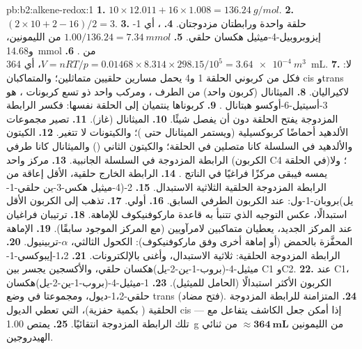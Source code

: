 \begin{solution}{pb:b2:alkene-redox:1}
\textbf{1.} $10 \times 12.011 + 16 \times 1.008 = \qty{136.24}{g/mol}$.
\textbf{2.} $(2 \times 10 + 2 - 16)/2 = 3$.
\textbf{3.} حلقة واحدة ورابطتان مزدوجتان.
\textbf{4.} ، أي 1-إيزوبروبيل-4-ميثيل هكسان حلقي.
\textbf{5.} $1.00/136.24 = \qty{7.34}{mmol}$ من الليمونين، و\qty{14.68}{mmol} من .
\textbf{6.} $V = nRT/p = 0.01468 \times 8.314 \times 298.15/10^5 = \qty{3.64e-4}{m^3}$،
أي \qty{364}{mL}.
\textbf{7.} لا: فكل من كربوني الحلقة 1 و4 يحمل مسارين حلقيين متماثلين؛ والمتماكبان cis 
وtrans لاكيراليان.
\textbf{8.} الميثانال  (كربون واحد) من الطرف ، ومركب واحد ذو تسع كربونات ،
هو 3-أسيتيل-6-أوكسو هبتانال .
\textbf{9.} كربوناها ينتميان إلى الحلقة نفسها: فكسر الرابطة المزدوجة يفتح الحلقة
دون أن يفصل شيئًا.
\textbf{10.} الميثانال (غاز).
\textbf{11.} تصير مجموعات الألدهيد أحماضًا كربوكسيلية (ويستمر الميثانال حتى )؛ 
والكيتونات لا تتغير.
\textbf{12.} الكيتون والألدهيد في السلسلة  كانا متصلين في الحلقة؛ والكيتون الثاني
() والميثانال كانا طرفي الرابطة المزدوجة في السلسلة الجانبية.
\textbf{13.} مركز واحد (الكربون C4 في الحلقة)؛ ولا يمسه  فيبقى
مركزًا فراغيًا في الناتج .
\textbf{14.} الرابطة  الخارج حلقية، الأقل إعاقة من الرابطة المزدوجة الحلقية الثلاثية الاستبدال.
\textbf{15.} 2-(4-ميثيل هكس-3-ين حلقي-1-يل)بروبان-1-ول:  عند الكربون الطرفي
السابق.
\textbf{16.} أولي.
\textbf{17.} تذهب  إلى الكربون الأقل استبدالًا، عكس التوجيه الذي
تتنبأ به قاعدة ماركوفنيكوف للإماهة.
\textbf{18.} ترتيبان فراغيان عند المركز الجديد، يعطيان متماكبين لامرآويين (مع المركز
الموجود سابقًا).
\textbf{19.} الإماهة المحفَّزة بالحمض (أو إماهة أخرى وفق ماركوفنيكوف): الكحول الثالثي،
$\alpha$-تربينيول.
\textbf{20.} الرابطة المزدوجة الحلقية: ثلاثية الاستبدال، وأغنى بالإلكترونات.
\textbf{21.} 1،2-إيبوكسي-1-ميثيل-4-(بروب-1-ين-2-يل)هكسان حلقي، والأكسجين يجسر بين C1 وC2.
\textbf{22.} عند C1، الكربون الأكثر استبدالًا (الحامل للميثيل).
\textbf{23.} 1-ميثيل-4-(بروب-1-ين-2-يل)هكسان حلقي-1،2-ديول، ومجموعتا  في وضع trans (فتح
مضاد).
\textbf{24.}  المتزامنة للرابطة المزدوجة الحلقية ( بكمية حفزية)، التي تعطي الديول
cis --- إذا أمكن جعل الكاشف يتفاعل مع تلك الرابطة المزدوجة انتقائيًا.
\textbf{25.} يمتص \qty{1.00}{g} من الليمونين $\boldsymbol{\approx \qty{364}{mL}}$ من
ثنائي الهيدروجين.
\end{solution}
